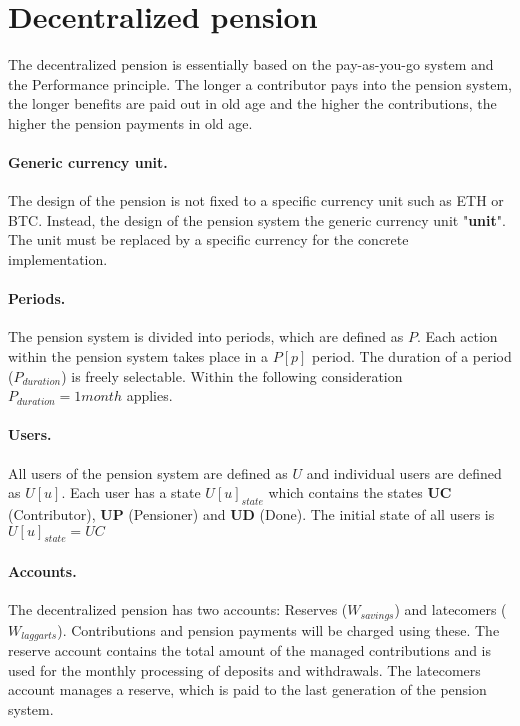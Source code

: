 \section{Decentralized pension}
The decentralized pension is essentially based on the pay-as-you-go system and the
Performance principle. The longer a contributor pays into the pension system, 
the longer benefits are paid out in old age and the higher the contributions,
the higher the pension payments in old age.

\paragraph{Generic currency unit.} The design of the pension is not fixed to a specific currency unit such as ETH or BTC. Instead, the design of the pension system the generic currency unit "\textbf{unit}". The unit must be replaced by a specific currency for the concrete implementation.

\paragraph{Periods.} The pension system is divided into periods, which are defined as $P$. Each action within the pension system takes place in a $P[p]$ period. The duration of a period ($P_{duration}$) is freely selectable. Within the following consideration $P_{duration} = 1 month$ applies.

\paragraph{Users.} All users of the pension system are defined as $U$ and individual users are defined as $U[u]$. Each user has a state $U[u]_{state}$ which contains the states \textbf{UC} (Contributor),
\textbf{UP} (Pensioner) and \textbf{UD} (Done).
The initial state of all users is $U[u]_{state} = UC$ 

\paragraph{Accounts.} The decentralized pension has two accounts: Reserves ($W_{savings}$) and latecomers  ($W_{laggarts}$). Contributions and pension payments will be charged using these. The reserve account contains the total amount of the managed contributions and is used for the monthly processing of deposits and withdrawals. The latecomers account manages a reserve, which is paid to the last generation of the pension system.

